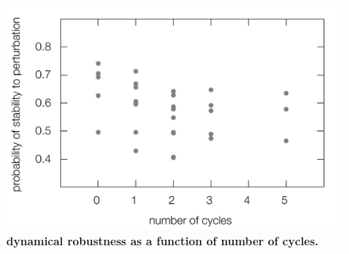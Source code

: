\pagebreak

\begin{figure}[!ht]
\centering
\noindent\includegraphics[width=0.8\columnwidth]{fig/cycle3x3.pdf}
\caption{{\bf dynamical robustness as a function of number of cycles.} }
\label{fig:cycle3x3}
\end{figure}





